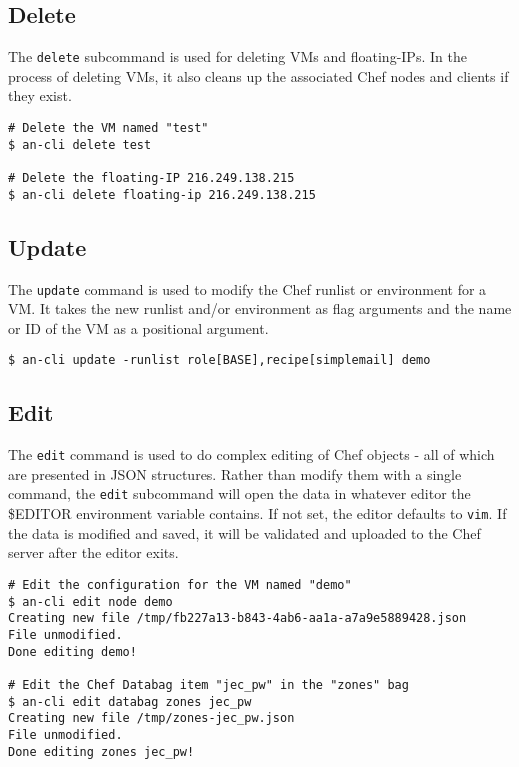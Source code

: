 \documentclass[11pt]{article}
\begin{document}
\subsection{Delete}

The \texttt{delete} subcommand is used for deleting VMs and
floating-IPs. In the process of deleting VMs, it also cleans up the
associated Chef nodes and clients if they exist.

\begin{lstlisting}
# Delete the VM named "test"
$ an-cli delete test

# Delete the floating-IP 216.249.138.215
$ an-cli delete floating-ip 216.249.138.215
\end{lstlisting}

\subsection{Update}

The \texttt{update} command is used to modify the Chef runlist or
environment for a VM. It takes the new runlist and/or environment as
flag arguments and the name or ID of the VM as a positional argument.

\begin{lstlisting}
$ an-cli update -runlist role[BASE],recipe[simplemail] demo
\end{lstlisting}

\subsection{Edit}

The \texttt{edit} command is used to do complex editing of Chef objects
- all of which are presented in JSON structures. Rather than modify them
with a single command, the \texttt{edit} subcommand will open the data
in whatever editor the \$EDITOR environment variable contains. If not
set, the editor defaults to \texttt{vim}. If the data is modified and
saved, it will be validated and uploaded to the Chef server after the
editor exits.

\begin{lstlisting}
# Edit the configuration for the VM named "demo"
$ an-cli edit node demo
Creating new file /tmp/fb227a13-b843-4ab6-aa1a-a7a9e5889428.json
File unmodified.
Done editing demo!

# Edit the Chef Databag item "jec_pw" in the "zones" bag
$ an-cli edit databag zones jec_pw
Creating new file /tmp/zones-jec_pw.json
File unmodified.
Done editing zones jec_pw!
\end{lstlisting}
\end{document}
